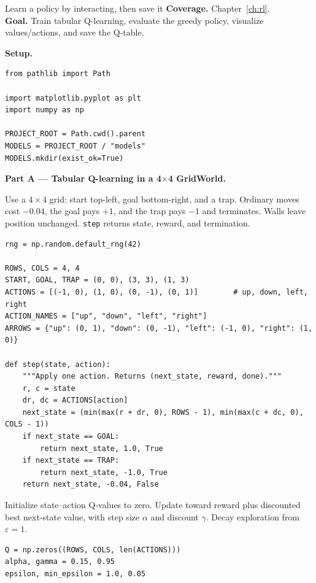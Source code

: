 
\begin{labproject}{Learn a policy by interacting, then save it}
\textbf{Coverage.} Chapter~\ref{ch:rl}.\\
\textbf{Goal.} Train tabular Q-learning, evaluate the greedy policy, visualize values/actions, and save the Q-table.

\medskip\noindent\textbf{Setup.}\par
\begin{lstlisting}[style=utppython]
from pathlib import Path

import matplotlib.pyplot as plt
import numpy as np

PROJECT_ROOT = Path.cwd().parent
MODELS = PROJECT_ROOT / "models"
MODELS.mkdir(exist_ok=True)
\end{lstlisting}

\medskip\noindent\textbf{Part A --- Tabular Q-learning in a 4$\times$4 GridWorld.}\par

Use a $4\times4$ grid: start top-left, goal bottom-right, and a trap. Ordinary moves cost $-0.04$, the goal pays $+1$, and the trap pays $-1$ and terminates. Walls leave position unchanged. \texttt{step} returns state, reward, and termination.

\begin{lstlisting}[style=utppython]
rng = np.random.default_rng(42)

ROWS, COLS = 4, 4
START, GOAL, TRAP = (0, 0), (3, 3), (1, 3)
ACTIONS = [(-1, 0), (1, 0), (0, -1), (0, 1)]        # up, down, left, right
ACTION_NAMES = ["up", "down", "left", "right"]
ARROWS = {"up": (0, 1), "down": (0, -1), "left": (-1, 0), "right": (1, 0)}

def step(state, action):
    """Apply one action. Returns (next_state, reward, done)."""
    r, c = state
    dr, dc = ACTIONS[action]
    next_state = (min(max(r + dr, 0), ROWS - 1), min(max(c + dc, 0), COLS - 1))
    if next_state == GOAL:
        return next_state, 1.0, True
    if next_state == TRAP:
        return next_state, -1.0, True
    return next_state, -0.04, False
\end{lstlisting}

Initialize state--action Q-values to zero. Update toward reward plus discounted best next-state value, with step size $\alpha$ and discount $\gamma$. Decay exploration from $\varepsilon=1$.

\begin{lstlisting}[style=utppython]
Q = np.zeros((ROWS, COLS, len(ACTIONS)))
alpha, gamma = 0.15, 0.95
epsilon, min_epsilon = 1.0, 0.05


\end{lstlisting}
\end{labproject}
